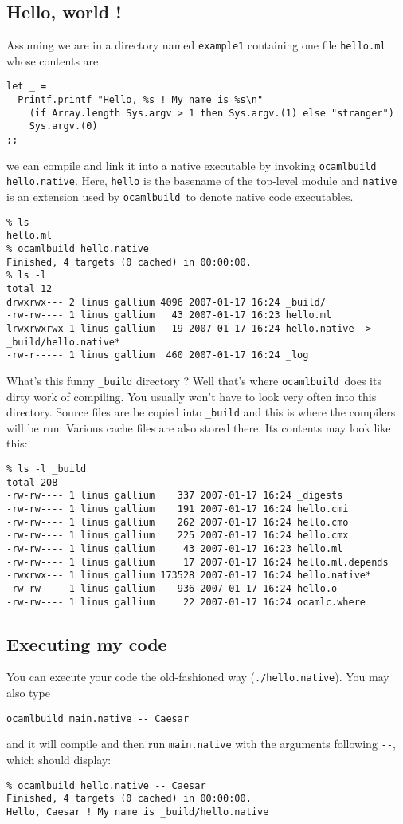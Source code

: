 \documentclass[12pt]{article}
\newcommand{\ocb}{\texttt{ocamlbuild}~}
\begin{document}
\subsection{Hello, world !}
Assuming we are in a directory named \texttt{example1} containing one file \texttt{hello.ml}
whose contents are
\begin{verbatim}
let _ =
  Printf.printf "Hello, %s ! My name is %s\n"
    (if Array.length Sys.argv > 1 then Sys.argv.(1) else "stranger")
    Sys.argv.(0)
;;
\end{verbatim}
we can compile and link it into a native executable by invoking \texttt{ocamlbuild hello.native}.
Here, \texttt{hello} is the basename of the top-level module and \texttt{native} is an extension used
by \ocb to denote native code executables.
\begin{verbatim}
% ls
hello.ml
% ocamlbuild hello.native        
Finished, 4 targets (0 cached) in 00:00:00.
% ls -l
total 12
drwxrwx--- 2 linus gallium 4096 2007-01-17 16:24 _build/
-rw-rw---- 1 linus gallium   43 2007-01-17 16:23 hello.ml
lrwxrwxrwx 1 linus gallium   19 2007-01-17 16:24 hello.native -> _build/hello.native*
-rw-r----- 1 linus gallium  460 2007-01-17 16:24 _log
\end{verbatim}
What's this funny \texttt{\_build} directory ?  Well that's where \ocb does its dirty work
of compiling.  You usually won't have to look very often into this directory.  Source files are be copied
into \texttt{\_build} and this is where the compilers will be run.  Various cache files are also stored
there.  Its contents may look like this:
\begin{verbatim}
% ls -l _build 
total 208
-rw-rw---- 1 linus gallium    337 2007-01-17 16:24 _digests
-rw-rw---- 1 linus gallium    191 2007-01-17 16:24 hello.cmi
-rw-rw---- 1 linus gallium    262 2007-01-17 16:24 hello.cmo
-rw-rw---- 1 linus gallium    225 2007-01-17 16:24 hello.cmx
-rw-rw---- 1 linus gallium     43 2007-01-17 16:23 hello.ml
-rw-rw---- 1 linus gallium     17 2007-01-17 16:24 hello.ml.depends
-rwxrwx--- 1 linus gallium 173528 2007-01-17 16:24 hello.native*
-rw-rw---- 1 linus gallium    936 2007-01-17 16:24 hello.o
-rw-rw---- 1 linus gallium     22 2007-01-17 16:24 ocamlc.where
\end{verbatim}
\subsection{Executing my code}
You can execute your code the old-fashioned way (\texttt{./hello.native}).
You may also type
\begin{verbatim}
ocamlbuild main.native -- Caesar
\end{verbatim}
and it will compile and then run \texttt{main.native} with the arguments following \texttt{-{}-},
which should display:
\begin{verbatim}
% ocamlbuild hello.native -- Caesar   
Finished, 4 targets (0 cached) in 00:00:00.
Hello, Caesar ! My name is _build/hello.native
\end{verbatim}
\end{document}
